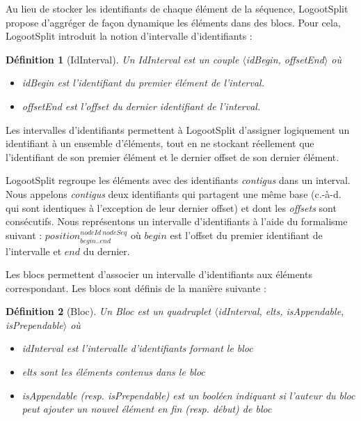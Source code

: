 \documentclass[12pt]{thesul}
\newtheorem{definition}{Définition}
\newcommand{\ie}{c.-à-d. }
\newcommand{\trm}[1]{\mathit{#1}}
\newcommand{\id}[3]{$\trm{#1}^{\trm{#2}}_{\trm{#3}}$}
\begin{document}
Au lieu de stocker les identifiants de chaque élément de la séquence, LogootSplit propose d'aggréger de façon dynamique les éléments dans des blocs.
Pour cela, LogootSplit introduit la notion d'intervalle d'identifiants :

\begin{definition}[IdInterval]
  Un \emph{IdInterval} est un couple $\langle$idBegin, offsetEnd$\rangle$ où
  \begin{itemize}
    \item idBegin est l'identifiant du premier élément de l'interval.
    \item offsetEnd est l'offset du dernier identifiant de l'interval.
  \end{itemize}
\end{definition}

Les intervalles d'identifiants permettent à LogootSplit d'assigner logiquement un identifiant à un ensemble d'éléments, tout en ne stockant réellement que l'identifiant de son premier élément et le dernier offset de son dernier élément.

LogootSplit regroupe les éléments avec des identifiants \emph{contigus} dans un interval.
Nous appelons \emph{contigus} deux identifiants qui partagent une même base (\ie qui sont identiques à l'exception de leur dernier offset) et dont les \emph{offsets} sont consécutifs.
Nous représentons un intervalle d'identifiants à l'aide du formalisme suivant : \id{position}{nodeId~nodeSeq}{begin..end} où $\trm{begin}$ est l'offset du premier identifiant de l'intervalle et $\trm{end}$ du dernier.

Les blocs permettent d'associer un intervalle d'identifiants aux éléments correspondant.
Les blocs sont définis de la manière suivante :

\begin{definition}[Bloc]
  Un \emph{Bloc} est un quadruplet $\langle$idInterval, elts, isAppendable, isPrependable$\rangle$ où
  \begin{itemize}
    \item idInterval est l'intervalle d'identifiants formant le bloc
    \item elts sont les éléments contenus dans le bloc
    \item isAppendable (resp. isPrependable) est un booléen indiquant si l'auteur du bloc peut ajouter un nouvel élément en fin (resp. début) de bloc
  \end{itemize}
\end{definition}
\end{document}
